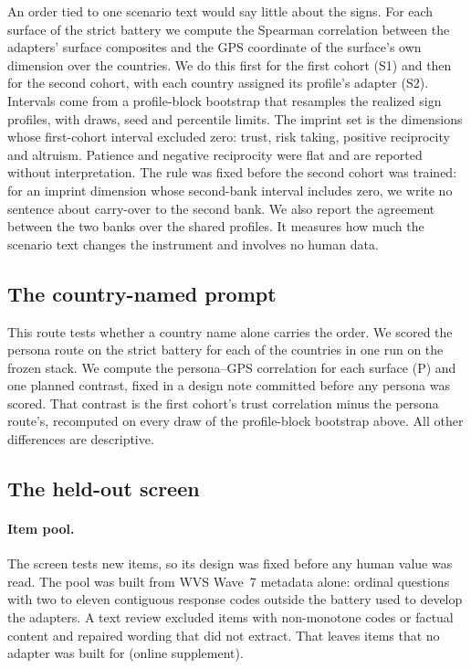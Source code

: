 An order tied to one scenario text would say little about the signs. For each surface of the strict battery we compute the Spearman correlation between the adapters' surface composites and the GPS coordinate of the surface's own dimension over the  countries. We do this first for the first cohort (S1) and then for the second cohort, with each country assigned its profile's adapter (S2). Intervals come from a profile-block bootstrap that resamples the  realized sign profiles, with  draws, seed  and percentile limits. The imprint set is the  dimensions whose first-cohort interval excluded zero: trust, risk taking, positive reciprocity and altruism. Patience and negative reciprocity were flat and are reported without interpretation. The rule was fixed before the second cohort was trained: for an imprint dimension whose second-bank interval includes zero, we write no sentence about carry-over to the second bank. We also report the agreement between the two banks over the  shared profiles. It measures how much the scenario text changes the instrument and involves no human data.

\subsection{The country-named prompt}\label{sec:design-persona}

This route tests whether a country name alone carries the order. We scored the persona route on the strict battery for each of the  countries in one run on the frozen stack. We compute the persona--GPS correlation for each surface (P) and one planned contrast, fixed in a design note committed before any persona was scored. That contrast is the first cohort's trust correlation minus the persona route's, recomputed on every draw of the profile-block bootstrap above. All other differences are descriptive.

\subsection{The held-out screen}\label{sec:design-screen}

\paragraph{Item pool.} The screen tests new items, so its design was fixed before any human value was read. The pool was built from WVS Wave~7 metadata alone: ordinal questions with two to eleven contiguous response codes outside the battery used to develop the adapters. A text review excluded items with non-monotone codes or factual content and repaired wording that did not extract. That leaves  items that no adapter was built for (online supplement).

